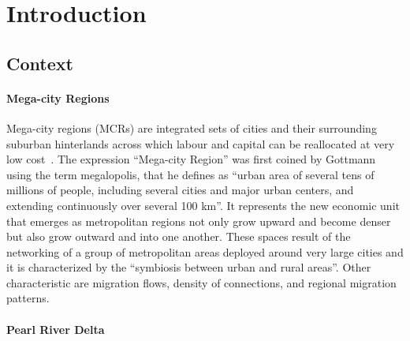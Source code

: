\section{Introduction}


\subsection{Context}

\paragraph{Mega-city Regions}

Mega-city regions (MCRs) are integrated sets of cities and their surrounding suburban hinterlands across which labour and capital can be reallocated at very low cost~\cite{florida2008rise}. The expression ``Mega-city Region'' was first coined by Gottmann~\cite{gottman1961megalopolis} using the term megalopolis, that he defines as “urban area of several tens of millions of people, including several cities and major urban centers, and extending continuously over several 100 km”. It represents the new economic unit that emerges as metropolitan regions not only grow upward and become denser but also grow outward and into one another.  These spaces result of the networking of a group of metropolitan areas deployed around very large cities and it is characterized by the “symbiosis between urban and rural areas”.  Other characteristic are migration flows, density of connections, and regional migration patterns. 



\paragraph{Pearl River Delta}

